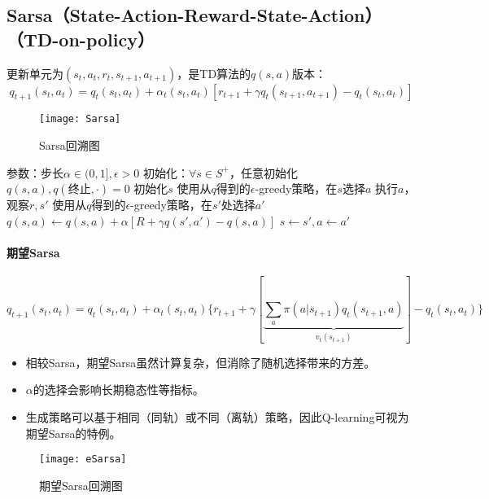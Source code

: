 \documentclass[
12pt, %
a4paper, 
oneside, %
headinclude,footinclude, %
]{scrartcl}
\begin{document}
\subsection[Sarsa]{Sarsa（State-Action-Reward-State-Action）（TD-on-policy）}
更新单元为$ (s_t, a_t, r_t, s_{t + 1}, a_{t + 1}) $，是TD算法的$ q(s, a) $版本：
$$ q_{t + 1}(s_t, a_t) = q_t(s_t, a_t) + \alpha_t(s_t, a_t)[r_{t + 1} + \gamma q_t(s_{t + 1}, a_{t + 1}) - q_t(s_t, a_t)] $$

\begin{figure}[H]
\centering
\texttt{[image: Sarsa]}
\caption{Sarsa回溯图}
\end{figure}
\begin{myalgorithm}
\State 参数：步长$ \alpha \in (0, 1], \epsilon > 0 $
\State 初始化：$ \forall s \in S^+ $，任意初始化$ q(s, a), q(\text{终止}, \cdot) = 0 $
\State 初始化$ s $
\State 使用从$ q $得到的$ \epsilon $-greedy策略，在$ s $选择$ a $
\State 执行$ a $，观察$ r, s' $
\State 使用从$ q $得到的$ \epsilon$-greedy策略，在$ s' $处选择$ a' $
\State $ q(s, a) \gets q(s, a) + \alpha [R + \gamma q(s', a') - q(s, a)] $
\State $ s \gets s', a \gets a' $
\EndWhile
\EndFor
\end{myalgorithm}
\paragraph{期望Sarsa}
$$ q_{t + 1}(s_t, a_t) = q_t(s_t, a_t) + \alpha_t(s_t, a_t)\{r_{t + 1} + \gamma[\underbrace{\sum_a \pi(a|s_{t + 1}) q_t(s_{t + 1}, a)}_{v_t(s_{t + 1})}] - q_t(s_t, a_t)\} $$

\noindent
\begin{minipage}{0.7\textwidth}
\begin{itemize}
\item 相较Sarsa，期望Sarsa虽然计算复杂，但消除了随机选择带来的方差。
\item $ \alpha $的选择会影响长期稳态性等指标。
\item 生成策略可以基于相同（同轨）或不同（离轨）策略，因此Q-learning可视为期望Sarsa的特例。
\end{itemize}
\end{minipage}
\begin{minipage}{0.3\textwidth}
\begin{figure}[H]
\centering
\texttt{[image: eSarsa]}
\caption{期望Sarsa回溯图}
\end{figure}
\end{minipage}
\end{document}
